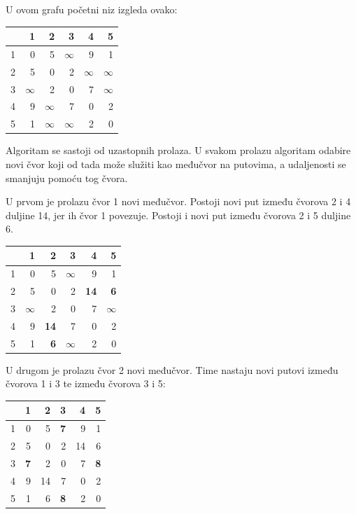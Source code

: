 U ovom grafu početni niz izgleda ovako:
\begin{center}
\begin{tabular}{r|rrrrr}
 & 1 & 2 & 3 & 4 & 5 \\
\hline
1 & 0 & 5 & $\infty$ & 9 & 1 \\
2 & 5 & 0 & 2 & $\infty$ & $\infty$ \\
3 & $\infty$ & 2 & 0 & 7 & $\infty$ \\
4 & 9 & $\infty$ & 7 & 0 & 2 \\
5 & 1 & $\infty$ & $\infty$ & 2 & 0 \\
\end{tabular}
\end{center}
\vspace{10pt}
Algoritam se sastoji od uzastopnih prolaza.
U svakom prolazu algoritam odabire novi čvor
koji od tada može služiti kao međučvor na putovima,
a udaljenosti se smanjuju pomoću tog čvora.

U prvom je prolazu čvor 1 novi međučvor.
Postoji novi put između čvorova 2 i 4
duljine 14, jer ih čvor 1 povezuje.
Postoji i novi put
između čvorova 2 i 5 duljine 6.

\begin{center}
\begin{tabular}{r|rrrrr}
 & 1 & 2 & 3 & 4 & 5 \\
\hline
1 & 0 & 5 & $\infty$ & 9 & 1 \\
2 & 5 & 0 & 2 & \textbf{14} & \textbf{6} \\
3 & $\infty$ & 2 & 0 & 7 & $\infty$ \\
4 & 9 & \textbf{14} & 7 & 0 & 2 \\
5 & 1 & \textbf{6} & $\infty$ & 2 & 0 \\
\end{tabular}
\end{center}
\vspace{10pt}

U drugom je prolazu čvor 2 novi međučvor.
Time nastaju novi putovi između čvorova 1 i 3
te između čvorova 3 i 5:

\begin{center}
\begin{tabular}{r|rrrrr}
 & 1 & 2 & 3 & 4 & 5 \\
\hline
1 & 0 & 5 & \textbf{7} & 9 & 1 \\
2 & 5 & 0 & 2 & 14 & 6 \\
3 & \textbf{7} & 2 & 0 & 7 & \textbf{8} \\
4 & 9 & 14 & 7 & 0 & 2 \\
5 & 1 & 6 & \textbf{8} & 2 & 0 \\
\end{tabular}
\end{center}
\vspace{10pt}

